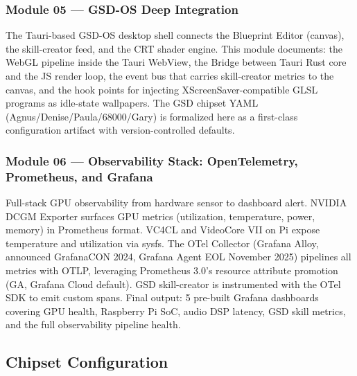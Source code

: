 \documentclass[11pt,letterpaper]{article}
\begin{document}
\subsubsection{Module 05 — GSD-OS Deep Integration}

The Tauri-based GSD-OS desktop shell connects the Blueprint Editor (canvas), the skill-creator feed, and the CRT shader engine. This module documents: the WebGL pipeline inside the Tauri WebView, the Bridge between Tauri Rust core and the JS render loop, the event bus that carries skill-creator metrics to the canvas, and the hook points for injecting XScreenSaver-compatible GLSL programs as idle-state wallpapers. The GSD chipset YAML (Agnus/Denise/Paula/68000/Gary) is formalized here as a first-class configuration artifact with version-controlled defaults.

\subsubsection{Module 06 — Observability Stack: OpenTelemetry, Prometheus, and Grafana}

Full-stack GPU observability from hardware sensor to dashboard alert. NVIDIA DCGM Exporter surfaces GPU metrics (utilization, temperature, power, memory) in Prometheus format. VC4CL and VideoCore VII on Pi expose temperature and utilization via sysfs. The OTel Collector (Grafana Alloy, announced GrafanaCON 2024, Grafana Agent EOL November 2025) pipelines all metrics with OTLP, leveraging Prometheus 3.0's resource attribute promotion (GA, Grafana Cloud default). GSD skill-creator is instrumented with the OTel SDK to emit custom spans. Final output: 5 pre-built Grafana dashboards covering GPU health, Raspberry Pi SoC, audio DSP latency, GSD skill metrics, and the full observability pipeline health.

\subsection{Chipset Configuration}
\end{document}
